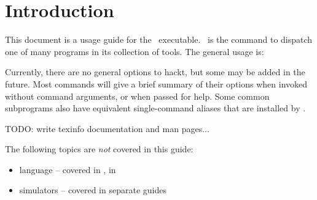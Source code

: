
\chapter{Introduction}
\label{sec:intro}

This document is a usage guide for the \binhackt\ executable.  
\binhackt\ is the command to dispatch one of many programs in its 
collection of tools.  
The general usage is:

\binhackt \ttt{[}\ttt{]} 
	\ttt{[}\ttt{]}

Currently, there are no general options to hackt, but some may
be added in the future.  
Most commands will give a brief summary of their options when 
invoked without command arguments, or when passed  for help.  
Some common subprograms also have equivalent single-command aliases
that are installed by .  

TODO: write texinfo documentation and man pages...

The following topics are \emph{not} covered in this guide:
\begin{itemize}
\item language -- covered in , in 
\item simulators -- covered in separate guides
\end{itemize}

